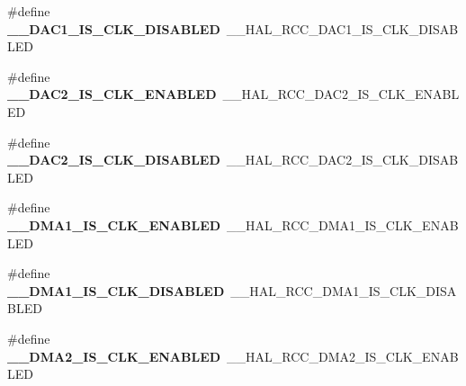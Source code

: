 \begin{DoxyCompactItemize}
\item 
\hypertarget{group___h_a_l___r_c_c___aliased_ga1f690182f7520375d42f4ea913191af7}{\#define {\bfseries \-\_\-\-\_\-\-D\-A\-C1\-\_\-\-I\-S\-\_\-\-C\-L\-K\-\_\-\-D\-I\-S\-A\-B\-L\-E\-D}~\-\_\-\-\_\-\-H\-A\-L\-\_\-\-R\-C\-C\-\_\-\-D\-A\-C1\-\_\-\-I\-S\-\_\-\-C\-L\-K\-\_\-\-D\-I\-S\-A\-B\-L\-E\-D}\label{group___h_a_l___r_c_c___aliased_ga1f690182f7520375d42f4ea913191af7}

\item 
\hypertarget{group___h_a_l___r_c_c___aliased_gad47e165f1cc2ccd6296e01c01cbf34f6}{\#define {\bfseries \-\_\-\-\_\-\-D\-A\-C2\-\_\-\-I\-S\-\_\-\-C\-L\-K\-\_\-\-E\-N\-A\-B\-L\-E\-D}~\-\_\-\-\_\-\-H\-A\-L\-\_\-\-R\-C\-C\-\_\-\-D\-A\-C2\-\_\-\-I\-S\-\_\-\-C\-L\-K\-\_\-\-E\-N\-A\-B\-L\-E\-D}\label{group___h_a_l___r_c_c___aliased_gad47e165f1cc2ccd6296e01c01cbf34f6}

\item 
\hypertarget{group___h_a_l___r_c_c___aliased_ga2701288e709e6bc30d7bc10732e7f854}{\#define {\bfseries \-\_\-\-\_\-\-D\-A\-C2\-\_\-\-I\-S\-\_\-\-C\-L\-K\-\_\-\-D\-I\-S\-A\-B\-L\-E\-D}~\-\_\-\-\_\-\-H\-A\-L\-\_\-\-R\-C\-C\-\_\-\-D\-A\-C2\-\_\-\-I\-S\-\_\-\-C\-L\-K\-\_\-\-D\-I\-S\-A\-B\-L\-E\-D}\label{group___h_a_l___r_c_c___aliased_ga2701288e709e6bc30d7bc10732e7f854}

\item 
\hypertarget{group___h_a_l___r_c_c___aliased_gab8af7da04e61260adcd91c8337e6a0b1}{\#define {\bfseries \-\_\-\-\_\-\-D\-M\-A1\-\_\-\-I\-S\-\_\-\-C\-L\-K\-\_\-\-E\-N\-A\-B\-L\-E\-D}~\-\_\-\-\_\-\-H\-A\-L\-\_\-\-R\-C\-C\-\_\-\-D\-M\-A1\-\_\-\-I\-S\-\_\-\-C\-L\-K\-\_\-\-E\-N\-A\-B\-L\-E\-D}\label{group___h_a_l___r_c_c___aliased_gab8af7da04e61260adcd91c8337e6a0b1}

\item 
\hypertarget{group___h_a_l___r_c_c___aliased_ga8f56d12b7d9fe3f69bed24d627a12aef}{\#define {\bfseries \-\_\-\-\_\-\-D\-M\-A1\-\_\-\-I\-S\-\_\-\-C\-L\-K\-\_\-\-D\-I\-S\-A\-B\-L\-E\-D}~\-\_\-\-\_\-\-H\-A\-L\-\_\-\-R\-C\-C\-\_\-\-D\-M\-A1\-\_\-\-I\-S\-\_\-\-C\-L\-K\-\_\-\-D\-I\-S\-A\-B\-L\-E\-D}\label{group___h_a_l___r_c_c___aliased_ga8f56d12b7d9fe3f69bed24d627a12aef}

\item 
\hypertarget{group___h_a_l___r_c_c___aliased_gacca89b6e7c7ee7e75d4b296c7f414d7d}{\#define {\bfseries \-\_\-\-\_\-\-D\-M\-A2\-\_\-\-I\-S\-\_\-\-C\-L\-K\-\_\-\-E\-N\-A\-B\-L\-E\-D}~\-\_\-\-\_\-\-H\-A\-L\-\_\-\-R\-C\-C\-\_\-\-D\-M\-A2\-\_\-\-I\-S\-\_\-\-C\-L\-K\-\_\-\-E\-N\-A\-B\-L\-E\-D}\label{group___h_a_l___r_c_c___aliased_gacca89b6e7c7ee7e75d4b296c7f414d7d}


\end{DoxyCompactItemize}
